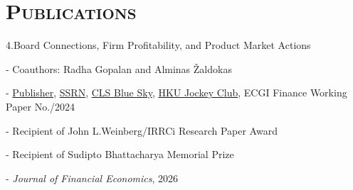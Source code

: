\documentclass[11pt]{article}
\renewenvironment{itemize}{
  \begin{list}{}{
    \setlength{\leftmargin}{1.5em}
  }
}{
  \end{list}
}
\newcommand{\GopalanLiZaldokas}{4}
\begin{document}
\section*{\textsc{Publications}}
\begin{itemize}
\item \GopalanLiZaldokas.\;Board Connections, Firm Profitability, and Product Market Actions
\begin{itemize}
\item - Coauthors: Radha Gopalan and Alminas {\v Z}aldokas
\item - \href{https://www.sciencedirect.com/science/article/abs/pii/S0304405X26001030}{Publisher}, \href{https://papers.ssrn.com/sol3/papers.cfm?abstract_id=4053853}{SSRN}, \href{https://clsbluesky.law.columbia.edu/2023/04/11/do-board-connections-between-product-market-peers-impede-competition/}{CLS Blue Sky}, \href{https://hkujcesgri.hku.hk/board-connections-firm-profitability-and-product-market-actions/}{HKU Jockey Club}, ECGI Finance Working Paper No./2024
\item - Recipient of John L.\;Weinberg/IRRCi Research Paper Award
\item - Recipient of Sudipto Bhattacharya Memorial Prize
\item - \emph{\sbweight Journal of Financial Economics}, 2026
\end{itemize}
\end{itemize}
\end{document}

